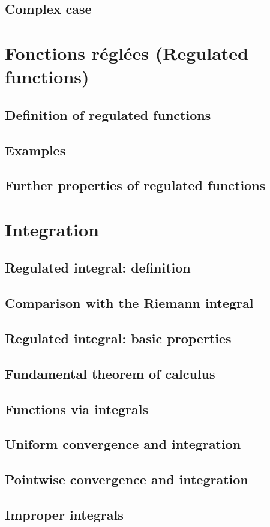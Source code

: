 \documentclass[10pt, a4paper]{article}
\begin{document}
\subsection{Complex case}

\newpage

\section{Fonctions réglées (Regulated functions)}

\subsection{Definition of regulated functions}

\subsection{Examples}

\subsection{Further properties of regulated functions}

\newpage

\section{Integration}

\subsection{Regulated integral: definition}

\subsection{Comparison with the Riemann integral}

\subsection{Regulated integral: basic properties}

\subsection{Fundamental theorem of calculus}

\subsection{Functions via integrals}

\subsection{Uniform convergence and integration}

\subsection{Pointwise convergence and integration}

\subsection{Improper integrals}
\end{document}

